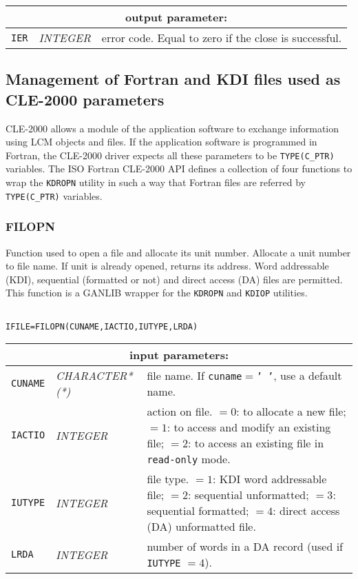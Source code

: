 \vskip 0.4cm
\goodbreak
\noindent
\begin{tabular}{|p{1.5cm}|p{3cm}|p{10cm}|}
\hline
\multicolumn{3}{|c|}{\bf output parameter:} \\
\hline
{\tt IER} & {\it INTEGER}  & error code. Equal to zero if the close is successful.  \\
\hline
\end{tabular}

\subsection {Management of Fortran and KDI files used as CLE-2000 parameters}

CLE-2000 allows a module of the application software to exchange information using LCM objects and files. If the
application software is programmed in Fortran, the CLE-2000 driver expects all these parameters to be {\tt TYPE(C\_PTR)}
variables. The ISO Fortran CLE-2000 API defines a collection of four functions to wrap the {\tt KDROPN} utility
in such a way that Fortran files are  referred by {\tt TYPE(C\_PTR)} variables.

\subsubsection{FILOPN}

Function used to open a file and allocate its unit number. Allocate a unit number to file
name. If unit is already opened, returns its address. Word addressable (KDI), sequential (formatted
or not) and direct access (DA) files are permitted.
This function is a GANLIB wrapper for the {\tt KDROPN} and {\tt KDIOP} utilities.

\begin{verbatim}

IFILE=FILOPN(CUNAME,IACTIO,IUTYPE,LRDA)
\end{verbatim}

\noindent
\begin{tabular}{|p{1.5cm}|p{3cm}|p{10cm}|}
\hline
\multicolumn{3}{|c|}{\bf input parameters:} \\
\hline
{\tt CUNAME} & {\it CHARACTER*(*)}  &  file name. If {\tt cuname}$=${\tt ' '}, use a default name. \\
\hline
{\tt IACTIO} & {\it INTEGER}  & action on file.
$=0$: to allocate a new file;
$=1$: to access and modify an existing file;
$=2$: to access an existing file in {\tt read-only} mode.  \\
\hline
{\tt IUTYPE} & {\it INTEGER}  & file type. 
$=1$:  KDI word addressable file;
$=2$:  sequential unformatted;
$=3$:  sequential formatted;
$=4$:  direct access (DA) unformatted file.  \\
\hline
{\tt LRDA} & {\it INTEGER}  & number of words in a DA record (used if {\tt IUTYPE} $= 4$).  \\
\hline
\end{tabular}

